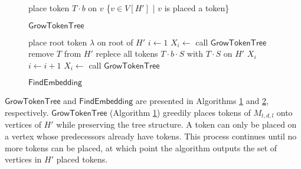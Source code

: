 \documentclass[runningheads]{llncs}
\theoremstyle{plain}
\theoremstyle{definition}
\begin{document}
\begin{figure}[!t]
\begin{algorithm}[H]
	\caption{$\mathsf{GrowTokenTree}$}
	\label{growtokentree}
	\begin{algorithmic}[1]
    \STATE place token $T \cdot b$ on $v$
    \ENDWHILE
    \RETURN \{$v \in V[H']$ | $v$ is placed a token\}
	\end{algorithmic}
\end{algorithm}
\end{figure}


\begin{figure}[!t]
\begin{algorithm}[H]
    \caption{$\mathsf{FindEmbedding}$}
	\label{findEmbedding}
	\begin{algorithmic}[1]
    \STATE place root token $\lambda$ on root of $H'$
    \STATE $i \leftarrow 1$
    \STATE $X_i  \leftarrow$ call $\mathsf{GrowTokenTree}$
    \STATE remove $T$ from $H'$
    \STATE replece all tokens $T \cdot b \cdot S$ with $T \cdot S$ on $H'$
    \ENDIF
    \ELSE
    \RETURN $X_i$
    \ENDIF
    \STATE $i \leftarrow i+1$
    \STATE $X_i \leftarrow$ call $\mathsf{GrowTokenTree}$
    \ENDWHILE
	\end{algorithmic}
\end{algorithm}
\end{figure}







$\mathsf{GrowTokenTree}$ and $\mathsf{FindEmbedding}$ are presented in Algorithms \ref{growtokentree} and \ref{findEmbedding}, respectively. $\mathsf{GrowTokenTree}$ (Algorithm \ref{growtokentree}) greedily places tokens of $M_{t, d, l}$ onto vertices of $H'$ while preserving the tree structure. A token can only be placed on a vertex whose predecessors already have tokens. This process continues until no more tokens can be placed, at which point the algorithm outputs the set of vertices in $H'$ placed tokens.
\end{document}

